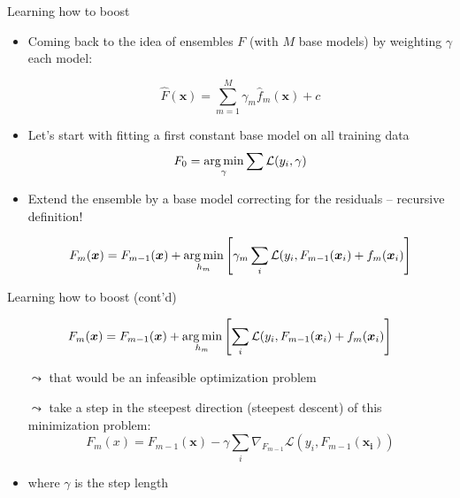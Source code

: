 \documentclass[aspectratio=169]{../latex_main/tntbeamer}  %
\begin{document}
	\begin{frame}[c]{Learning how to boost}

    \vspace{-1em}
    \begin{itemize}
        \item Coming back to the idea of ensembles $F$ (with $M$ base models) by weighting $\gamma$ each model:
        
        $$ \hat{F}(\bm{x}) = \sum_{m=1}^{M} \gamma_m \hat{f}_m(\bm{x}) + c $$
        \item Let's start with fitting a first constant base model on all training data
        $$F_0 = \operatorname*{arg\,min}_{\gamma} \sum \mathcal{L}(y_i, \gamma) $$
        \item Extend the ensemble by a base model correcting for the residuals -- recursive definition!
        
        $$ F_m (\bm{x}) = F_{m-1}(\bm{x}) + \operatorname*{arg\,min}_{h_m} \left[ \gamma_m \sum_i \mathcal{L}(y_i, F_{m-1}(\bm{x}_i) + f_m(\bm{x}_i) \right] $$
    \end{itemize}

	\end{frame}
	
	\begin{frame}[c]{Learning how to boost (cont'd)}

    \vspace{-1em}
    $$ F_m (\bm{x}) = F_{m-1}(\bm{x}) + \operatorname*{arg\,min}_{h_m} \left[ \sum_i \mathcal{L}(y_i, F_{m-1}(\bm{x}_i) + f_m(\bm{x}_i) \right] $$
    \begin{itemize}
        \item[$\leadsto$] that would be an infeasible optimization problem
        \item[$\leadsto$] take a step in the steepest direction (steepest descent) of this minimization problem:
        $$ F_m(x) = F_{m-1}(\bm{x}) - \gamma \sum_i \nabla_{F_{m-1}} \mathcal{L}(y_i, F_{m-1}(\bm{x_i})) $$
        \item where $\gamma$ is the step length
    \end{itemize}

	\end{frame}
	
\end{document}
